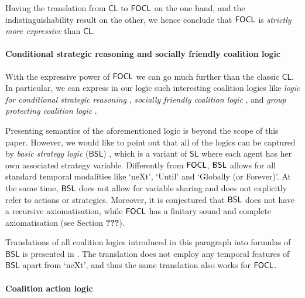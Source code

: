 \documentclass{article}
\theoremstyle{definition}
\begin{document}
Having the translation from $\mathsf{CL}$ to $\mathsf{FOCL}$ on the one hand, and the indistinguishability result on the other, we hence conclude that $\mathsf{FOCL}$ is \textit{strictly more expressive} than $\mathsf{CL}$.

\paragraph{Conditional strategic reasoning and socially friendly coalition logic} With the expressive power of $\mathsf{FOCL}$ we can go much further than the classic $\mathsf{CL}$. In particular, we can express in our logic such interesting coalition logics like \textit{logic for conditional strategic reasoning} \cite{goranko22}, \textit{socially friendly coalition logic} \cite{goranko18}, and \textit{group protecting coalition logic}  \cite{goranko18}. 

Presenting semantics of the aforementioned logic is beyond the scope of this paper. However, we would like to point out that all of the logics can be captured by \textit{basic strategy logic} ($\mathsf{BSL}$) \cite{goranko23}, which is a variant of $\mathsf{SL}$ where each agent has her own associated strategy variable. Differently from $\mathsf{FOCL}$, $\mathsf{BSL}$ allows for all standard temporal modalities like `ne\textsf{X}t', `\textsf{U}ntil' and `\textsf{G}lobally (or Forever)'. At the same time, $\mathsf{BSL}$ does not allow for variable sharing and does not explicitly refer to actions or strategies. Moreover, it is conjectured \cite{goranko23} that $\mathsf{BSL}$ does not have a recursive axiomatisation, while $\mathsf{FOCL}$ has a finitary sound and complete axiomatisation (see Section \textbf{???}).

Translations of all coalition logics introduced in this paragraph into formulas of $\mathsf{BSL}$ is presented in \cite{goranko23}. The translation does not employ any temporal features of $\mathsf{BSL}$ apart from `ne\textsf{X}t', and thus the same translation also works for $\mathsf{FOCL}$. 



\paragraph{Coalition action logic} 
\end{document}
